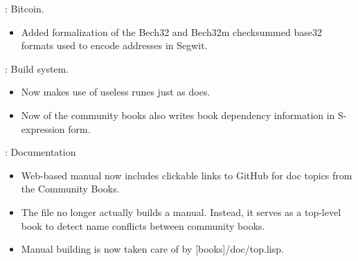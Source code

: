 
\begin{frame}

\implibtitle

:
Bitcoin.
\begin{itemize}
\item Added formalization of the Bech32 and Bech32m checksummed base32 formats
      used to encode addresses in Segwit.
\end{itemize}

\end{frame}


\begin{frame}

\implibtitle

:
Build system.
\begin{itemize}
\item Now  makes use of useless runes just as  does.
\item Now  of the community books also writes book dependency
      information in S-expression form.
\end{itemize}

\end{frame}


\begin{frame}

\implibtitle

: Documentation

\begin{itemize}

\item Web-based manual now includes clickable links to GitHub for doc topics from the Community Books.

\item The file  no longer actually builds a manual.  Instead, it serves as a top-level book to detect name conflicts between community books.

\item Manual building is now taken care of by [books]/doc/top.lisp.

\end{itemize}

\end{frame}

